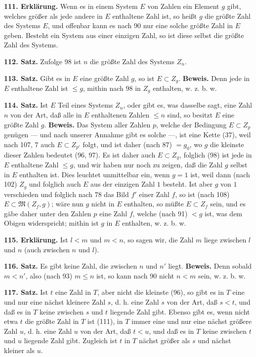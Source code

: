 \documentclass[11pt]{article}
\newcommand{\Mf}{\mathfrak{M}}
\newcommand{\partof}{\mathrel{\subset}}
\begin{document}
\noindent\textbf{111. Erklärung.} Wenn es in einem System $E$ von Zahlen ein Element $g$ gibt, welches größer als jede andere in $E$ enthaltene Zahl ist, so heißt $g$ die größte Zahl des Systems $E$, und offenbar kann es nach 90 nur eine solche größte Zahl in $E$ geben. Besteht ein System aus einer einzigen Zahl, so ist diese selbst die größte Zahl des Systems.

\noindent\textbf{112. Satz.} Zufolge 98 ist $n$ die größte Zahl des Systems $Z_n$.

\noindent\textbf{113. Satz.} Gibt es in $E$ eine größte Zahl $g$, so ist $E\partof Z_g$. \textbf{Beweis.} Denn jede in $E$ enthaltene Zahl ist $\le g$, mithin nach 98 in $Z_g$ enthalten, w. z. b. w.

\noindent\textbf{114. Satz.} Ist $E$ Teil eines Systems $Z_n$, oder gibt es, was dasselbe sagt, eine Zahl $n$ von der Art, daß alle in $E$ enthaltenen Zahlen $\le n$ sind, so besitzt $E$ eine größte Zahl $g$. \textbf{Beweis.} Das System aller Zahlen $p$, welche der Bedingung $E\partof Z_p$ genügen — und nach unserer Annahme gibt es solche —, ist eine Kette (37), weil nach 107, 7 auch $E\partof Z_{p'}$ folgt, und ist daher (nach 87) $=g_0$, wo $g$ die kleinste dieser Zahlen bedeutet (96, 97). Es ist daher auch $E\partof Z_g$, folglich (98) ist jede in $E$ enthaltene Zahl $\le g$, und wir haben nur noch zu zeigen, daß die Zahl $g$ selbst in $E$ enthalten ist. Dies leuchtet unmittelbar ein, wenn $g=1$ ist, weil dann (nach 102) $Z_g$ und folglich auch $E$ aus der einzigen Zahl $1$ besteht. Ist aber $g$ von $1$ verschieden und folglich nach 78 das Bild $f'$ einer Zahl $f$, so ist (nach 108) $E\partof\Mf(Z_f,g)$; wäre nun $g$ nicht in $E$ enthalten, so müßte $E\partof Z_f$ sein, und es gäbe daher unter den Zahlen $p$ eine Zahl $f$, welche (nach 91) $<g$ ist, was dem Obigen widerspricht; mithin ist $g$ in $E$ enthalten, w. z. b. w.

\noindent\textbf{115. Erklärung.} Ist $l<m$ und $m<n$, so sagen wir, die Zahl $m$ liege zwischen $l$ und $n$ (auch zwischen $n$ und $l$).

\noindent\textbf{116. Satz.} Es gibt keine Zahl, die zwischen $n$ und $n'$ liegt. \textbf{Beweis.} Denn sobald $m<n'$, also (nach 93) $m\le n$ ist, so kann nach 90 nicht $n<m$ sein, w. z. b. w.

\noindent\textbf{117. Satz.} Ist $t$ eine Zahl in $T$, aber nicht die kleinste (96), so gibt es in $T$ eine und nur eine nächst kleinere Zahl $s$, d. h. eine Zahl $s$ von der Art, daß $s<t$, und daß es in $T$ keine zwischen $s$ und $t$ liegende Zahl gibt. Ebenso gibt es, wenn nicht etwa $t$ die größte Zahl in $T$ ist (111), in $T$ immer eine und nur eine nächst größere Zahl $u$, d. h. eine Zahl $u$ von der Art, daß $t<u$, und daß es in $T$ keine zwischen $t$ und $u$ liegende Zahl gibt. Zugleich ist $t$ in $T$ nächst größer als $s$ und nächst kleiner als $u$.
\end{document}
